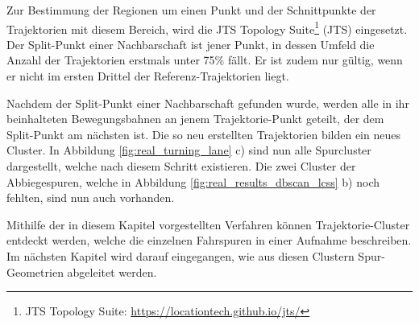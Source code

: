 Zur Bestimmung der Regionen um einen Punkt und der Schnittpunkte der Trajektorien mit diesem Bereich,
wird die JTS Topology Suite\footnote{JTS Topology Suite: \url{https://locationtech.github.io/jts/}}
(JTS) eingesetzt. Der Split-Punkt einer Nachbarschaft ist jener Punkt, in dessen Umfeld die Anzahl der
Trajektorien erstmals unter 75\% fällt. Er ist zudem nur gültig, wenn er nicht im ersten Drittel der
Referenz-Trajektorien liegt.

Nachdem der Split-Punkt einer Nachbarschaft gefunden wurde, werden alle in ihr beinhalteten Bewegungsbahnen
an jenem Trajektorie-Punkt geteilt, der dem Split-Punkt am nächsten ist. 
Die so neu erstellten Trajektorien bilden ein neues Cluster. In Abbildung \ref{fig:real_turning_lane} c)
sind nun alle Spurcluster dargestellt, welche nach diesem Schritt existieren. Die zwei Cluster der Abbiegespuren,
welche in Abbildung \ref{fig:real_results_dbscan_lcss} b) noch fehlten, sind nun auch vorhanden.

Mithilfe der in diesem Kapitel vorgestellten Verfahren können Trajektorie-Cluster entdeckt werden, welche
die einzelnen Fahrspuren in einer Aufnahme beschreiben. Im nächsten Kapitel wird darauf eingegangen, wie
aus diesen Clustern Spur-Geometrien abgeleitet werden.